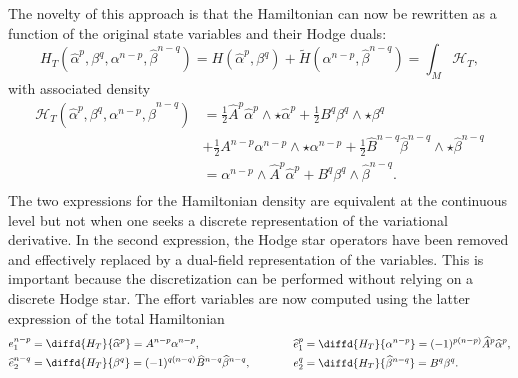 \documentclass{elsarticle}
\newcommand{\revTwo}[1]{{\color{black}#1}}
\newcommand*{\dual}[1]{\ensuremath{\widehat{#1}}}
\begin{document}
The novelty of this approach is that the Hamiltonian can now be rewritten as a function of the \revTwo{original}  state variables \revTwo{and their Hodge duals}:
 \begin{equation}
H_T(\dual{\alpha}^p, \beta^{q}, {\alpha}^{n-p}, \dual{\beta}^{n-q}) = H(\dual{\alpha}^p, \beta^{q}) + \widetilde{H}({\alpha}^{n-p}, \dual{\beta}^{n-q})= \int_M \mathcal{H}_T,
\end{equation}
with associated density
\revTwo{
\begin{equation*}
\begin{aligned}
    \mathcal{H}_T
(\dual{\alpha}^p, \beta^{q} 
,{\alpha}^{n-p}, \dual{\beta}^{n-q})
&=\frac{1}{2} \dual{A}^p \dual{\alpha}^p \wedge {\star \dual{\alpha}^p} + \frac{1}{2}  B^q \beta^{q} \wedge {\star  \beta^{q}} \\
&+ \frac{1}{2} {A}^{n-p} {\alpha}^{n-p} \wedge {\star {\alpha}^{n-p}} + \frac{1}{2} \dual{B}^{n-q} \dual{\beta}^{n-q} \wedge {\star  \dual{\beta}^{n-q}} \\
&= {\alpha}^{n-p} \wedge \dual{A}^p \dual{\alpha}^p
+ B^q \beta^{q} \wedge \dual{\beta}^{n-q}. \\
\end{aligned}
\end{equation*}
}
 \revTwo{The two expressions for the Hamiltonian density are equivalent at the continuous level but not when one seeks a discrete representation of the variational derivative. In the second expression, the Hodge star operators have been removed and effectively replaced by a dual-field representation of the variables. This is important because the discretization can be performed without relying on a discrete Hodge star. The effort variables are now computed using the latter expression of the total Hamiltonian}
\begin{equation}
\begin{aligned}
    e^{n-p}_1 &= \diffd{H_T}{\dual{\alpha}^p} = {A}^{n-p} {\alpha}^{n-p}, \\
    \dual{e}^{n-q}_2 &= \diffd{H_T}{\beta^{q}} = (-1)^{q(n-q)} \dual{B}^{n-q} \dual{\beta}^{n-q}, \\
\end{aligned} \qquad \qquad
\begin{aligned}
    \dual{e}^p_1 &= \diffd{H_T}{{\alpha}^{n-p}} = (-1)^{p(n-p)}\dual{A}^p \dual{\alpha}^p, \\
    {e}^q_2 &= \diffd{H_T}{\dual{\beta}^{n-q}} = B^q \beta^{q}. \\
\end{aligned}
\end{equation}
\end{document}
